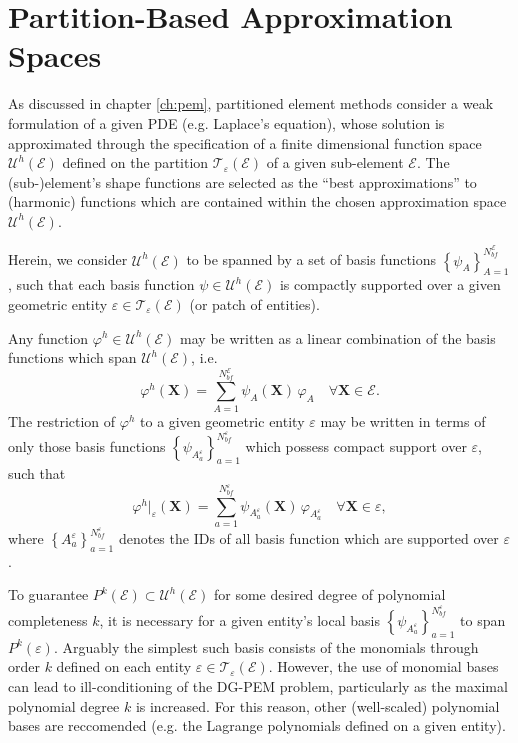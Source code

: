 \section{Partition-Based Approximation Spaces}

		As discussed in chapter \ref{ch:pem}, partitioned element methods consider a weak formulation of a given PDE (e.g. Laplace's equation), whose solution is approximated through the specification of a finite dimensional function space $\mathcal{U}^h (\mathcal{E})$ defined on the partition $\mathcal{T}_{\varepsilon} (\mathcal{E})$ of a given sub-element $\mathcal{E}$. The (sub-)element's shape functions are selected as the ``best approximations'' to (harmonic) functions which are contained within the chosen approximation space $\mathcal{U}^h (\mathcal{E})$.
		
		Herein, we consider $\mathcal{U}^h (\mathcal{E})$ to be spanned by a set of basis functions $\left\{ \psi_A \right\}_{A=1}^{N^{\mathcal{E}}_{bf}}$, such that each basis function $\psi \in \mathcal{U}^h (\mathcal{E})$ is compactly supported over a given geometric entity $\varepsilon \in \mathcal{T}_\varepsilon (\mathcal{E})$ (or patch of entities).
		
		Any function $\varphi^h \in \mathcal{U}^h (\mathcal{E})$ may be written as a linear combination of the basis functions which span $\mathcal{U}^h (\mathcal{E})$, i.e.
		\begin{equation}
			\varphi^h (\mathbf{X}) = \sum_{A=1}^{N^{\mathcal{E}}_{bf}} \psi_A (\mathbf{X}) \, \varphi_A \quad \forall \mathbf{X} \in \mathcal{E}.
		\end{equation}
		The restriction of $\varphi^h$ to a given geometric entity $\varepsilon$ may be written in terms of only those basis functions $\left\{ \psi_{A^\varepsilon_a} \right\}_{a=1}^{N^\varepsilon_{bf}}$ which possess compact support over $\varepsilon$, such that
		\begin{equation}
			\varphi^h|_\varepsilon (\mathbf{X}) = \sum_{a=1}^{N^\varepsilon_{bf}} \psi_{A^\varepsilon_a} (\mathbf{X}) \, \varphi_{A^\varepsilon_a} \quad \forall \mathbf{X} \in \varepsilon,
		\end{equation}
		where $\left\{ A^\varepsilon_a \right\}_{a=1}^{N^\varepsilon_{bf}}$ denotes the IDs of all basis function which are supported over $\varepsilon$.
		
		To guarantee $P^k (\mathcal{E}) \subset \mathcal{U}^h (\mathcal{E})$ for some desired degree of polynomial completeness $k$, it is necessary for a given entity's local basis $\left\{ \psi_{A^\varepsilon_a} \right\}_{a=1}^{N^\varepsilon_{bf}}$ to span $P^k (\varepsilon)$. Arguably the simplest such basis consists of the monomials through order $k$ defined on each entity $\varepsilon \in \mathcal{T}_\varepsilon (\mathcal{E})$. However, the use of monomial bases can lead to ill-conditioning of the DG-PEM problem, particularly as the maximal polynomial degree $k$ is increased. For this reason, other (well-scaled) polynomial bases are reccomended (e.g. the Lagrange polynomials defined on a given entity).
		
